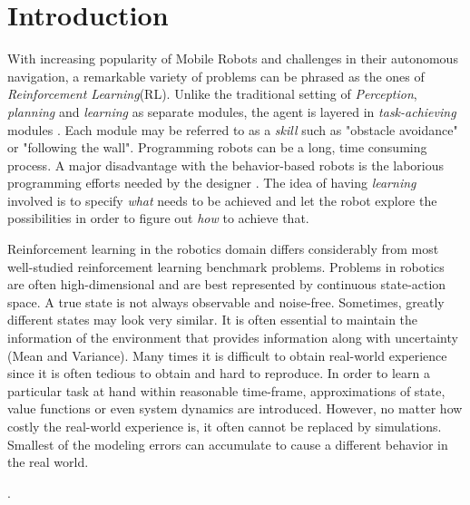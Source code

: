 \documentclass[12pt]{report}
\begin{document}
\tableofcontents
\pagebreak

\listoffigures
\pagebreak



\pagestyle{myheadings}



\chapter{Introduction} %

\label{introduction} %

With increasing popularity of Mobile Robots and challenges in their autonomous navigation, a remarkable variety of problems can be phrased as the ones of \textit{Reinforcement Learning}(RL). Unlike the traditional setting of \textit{Perception}, \textit{planning} and \textit{learning} as separate modules, the agent is layered in \textit{task-achieving} modules \cite{mahadevan1992automatic}. Each module may be referred to as a \textit{skill} such as "obstacle avoidance" or "following the wall". Programming robots can be a long, time consuming process. A major disadvantage with the behavior-based robots is the laborious programming efforts needed by the designer \cite{mahadevan1992automatic} \cite{smart2002effective}. The idea of having \textit{learning} involved is to specify \textit{what} needs to be achieved and let the robot explore the possibilities in order to figure out \textit{how} to achieve that.\par

Reinforcement learning in the robotics domain differs considerably from most well-studied reinforcement
learning benchmark problems. Problems in robotics are often high-dimensional and are best represented by continuous state-action space. A true state is not always observable and noise-free. Sometimes, greatly different states may look very similar. It is often essential to maintain the information of the environment that provides information along with uncertainty (Mean and Variance). Many times it is difficult to obtain real-world experience since it is often tedious to obtain and hard to reproduce. In order to learn a particular task at hand within reasonable time-frame, approximations of state, value functions or even system dynamics are introduced.  However, no matter how costly the real-world experience is, it often cannot be replaced by simulations. Smallest of the modeling errors can accumulate to cause a different behavior in the real world.\par {}.
\end{document}
